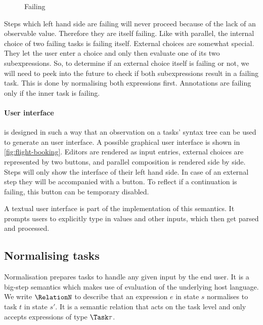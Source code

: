 \begin{figure}[h]
  \small
  \caption{Failing} \label{fig:observation-failing}
\end{figure}

Steps which left hand side are failing will never proceed because of the lack of an observable value.
Therefore they are itself failing.
Like with parallel, the internal choice of two failing tasks is failing itself.
External choices are somewhat special.
They let the user enter a choice and only then evaluate one of its two subexpressions.
So, to determine if an external choice itself is failing or not,
we will need to peek into the future to check if both subexpressions result in a failing task.
This is done by normalising both expressions first.
Annotations are failing only if the inner task is failing.



\paragraph{User interface}

\TOPHAT is designed in such a way that an observation on a tasks' syntax tree can be used to generate an user interface.
A possible graphical user interface is shown in \cref{fig:flight-booking}.
Editors are rendered as \HTML input entries,
external choices are represented by two buttons,
and parallel composition is rendered side by side.
Steps will only show the interface of their left hand side.
In case of an external step they will be accompanied with a button.
To reflect if a continuation is failing, this button can be temporary disabled.

A textual user interface is part of the implementation of this semantics.
It prompts users to explicitly type in values and other inputs,
which then get parsed and processed.



\subsection{Normalising tasks}
\label{sec:normalise}

Normalisation prepares tasks to handle any given input by the end user.
It is a big-step semantics which makes use of evaluation of the underlying host language.
We write $\RelationN$ to describe that
an expression $e$ in state $s$ normalises to task $t$ in state $s'$.
It is a semantic relation that acts on the task level
and only accepts expressions of type $\Task \tau$.

